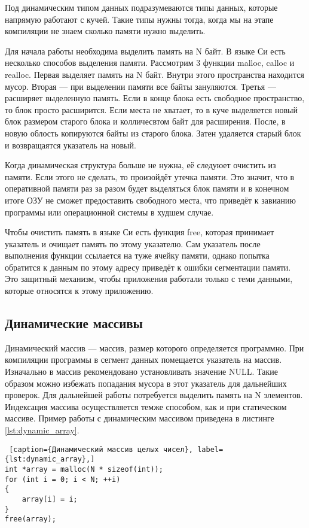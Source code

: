 \documentclass{bmstu}
\begin{document}
Под динамическим типом данных подразумеваются типы данных, которые напрямую работают с кучей.
Такие типы нужны тогда, когда мы на этапе компиляции не знаем сколько памяти нужно выделить.

Для начала работы необходима выделить память на N байт.
В языке Си есть несколько способов выделения памяти.
Рассмотрим 3 функции malloc, calloc и realloc.
Первая выделяет память на N байт. 
Внутри этого пространства находится мусор.
Вторая --- при выделении памяти все байты зануляются.
Третья --- расширяет выделенную память.
Если в конце блока есть свободное пространство, то блок просто расширится.
Если места не хватает, то в куче выделяется новый блок размером старого блока и колличесвтом байт для расширения.
После, в новую облость копируются байты из старого блока.
Затен удаляется старый блок и возвращаятся указатель на новый.

Когда динамическая структура больше не нужна, её следуюет очистить из памяти.
Если этого не сделать, то произойдёт утечка памяти.
Это значит, что в оперативной памяти раз за разом будет выделяться блок памяти и в конечном итоге ОЗУ не сможет предоставить свободного места, что приведёт к завианию программы или операционной системы в худшем случае.

Чтобы очистить память в языке Си есть функция free, которая принимает указатель и очищает память по этому указателю.
Сам указатель после выполнения функции ссылается на туже ячейку памяти, однако попытка обратится к данным по этому адресу приведёт к ошибки сегментации памяти.
Это защитный механизм, чтобы приложения работали только с теми данными, которые относятся к этому приложению.

\subsection{Динамические массивы}

Динамический массив --- массив, размер которого определяется программно.
При компиляции программы в сегмент данных помещается указатель на массив. 
Изначально в массив рекомендовано установливать значение NULL.
Такие образом можно избежать попадания мусора в этот указатель для дальнейших проверок. 
Для дальнейшей работы потребуется выделить память на N элементов.
Индексация массива осуществляется темже способом, как и при статическом массиве.
Пример работы с динамическим массивом приведена в листинге \ref{lst:dynamic_array}.

\begin{lstlisting} [caption={Динамический массив целых чисел}, label={lst:dynamic_array},]
int *array = malloc(N * sizeof(int));
for (int i = 0; i < N; ++i)
{
    array[i] = i;
}
free(array);
\end{lstlisting}
\end{document}
